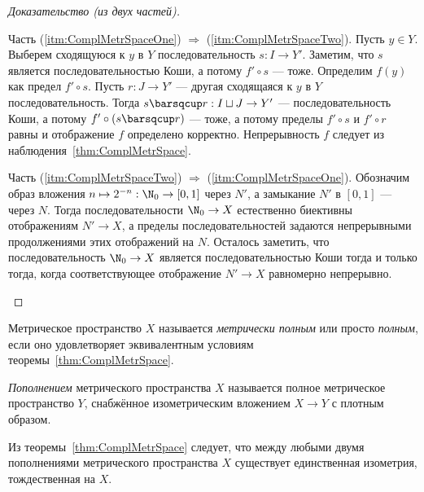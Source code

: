 \documentclass[
	extrafontsizes,
	11pt,
	hyphens,
]{memoir}
\begin{document}
\begin{proof}[Доказательство (из двух частей)]
~\begin{proofdescription}

\item[Часть (\ref{itm:ComplMetrSpaceOne}) \(\Rightarrow\) (\ref{itm:ComplMetrSpaceTwo}).]
Пусть \(y \in Y\). Выберем сходящуюся к \(y\) в \(Y\) последовательность \(s : I \to Y'\).
Заметим, что \(s\) является последовательностью Коши, а потому \(f' \circ s\) --- тоже.
Определим \(f(y)\) как предел \(f' \circ s\).
Пусть \(r : J \to Y'\) --- другая сходящаяся к \(y\) в \(Y\) последовательность.
Тогда \(s \barsqcup r : I \sqcup J \to Y'\) --- последовательность Коши, а потому \(f' \circ (s \barsqcup r)\) --- тоже, а потому пределы \(f' \circ s\) и \(f' \circ r\) равны и отображение \(f\) определено корректно.
Непрерывность \(f\) следует из наблюдения~\ref{thm:ComplMetrSpace}.

\item[Часть (\ref{itm:ComplMetrSpaceTwo}) \(\Rightarrow\) (\ref{itm:ComplMetrSpaceOne}).]
Обозначим образ вложения \(n \mapsto 2^{-n} : \N_0 \to [0,1]\) через \(N'\), а замыкание \(N'\) в \([0,1]\) --- через \(N\).
Тогда последовательности \(\N_0 \to X\) естественно биективны отображениям \(N' \to X\), а пределы последовательностей задаются непрерывными продолжениями этих отображений на \(N\).
Осталось заметить, что последовательность \(\N_0 \to X\) является последовательностью Коши тогда и только тогда, когда соответствующее отображение \(N' \to X\) равномерно непрерывно.
\qedhere

\end{proofdescription}
\end{proof}

\begin{definition}
Метрическое пространство \(X\) называется \emph{метрически полным} или просто \emph{полным}, если оно удовлетворяет эквивалентным условиям теоремы~\ref{thm:ComplMetrSpace}.
\end{definition}

\begin{definition}
\emph{Пополнением} метрического пространства \(X\) называется полное метрическое пространство \(Y\), снабжённое изометрическим вложением \(X \to Y\) с плотным образом.
\end{definition}

\begin{remark}
Из теоремы~\ref{thm:ComplMetrSpace} следует, что между любыми двумя пополнениями метрического пространства \(X\) существует единственная изометрия, тождественная на \(X\).
\end{remark}
\end{document}

